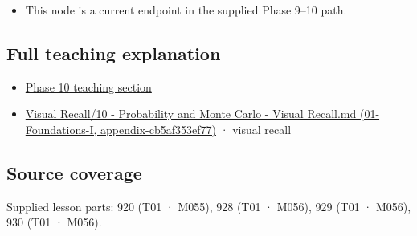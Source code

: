 \begin{itemize}
\tightlist
\item
  This node is a current endpoint in the supplied Phase 9--10 path.
\end{itemize}

\subsection{Full teaching explanation}\label{full-teaching-explanation}

\begin{itemize}
\tightlist
\item
  \href{Continuous\%20Notes/Computing\%20Foundations\%20-\%20From\%20Bits\%20to\%20C++\%20and\%20Systems\%20APIs\#5.\%20Waiting\%20times,\%20event\%20counts,\%20and\%20covariance\%20geometry}{Phase 10 teaching section}
\item
  \href{}{Visual Recall/10 - Probability and Monte Carlo - Visual Recall.md (01-Foundations-I, appendix-cb5af353ef77)} · visual recall
\end{itemize}

\subsection{Source coverage}\label{source-coverage}

Supplied lesson parts: 920 (T01 · M055), 928 (T01 · M056), 929 (T01 · M056), 930 (T01 · M056).
